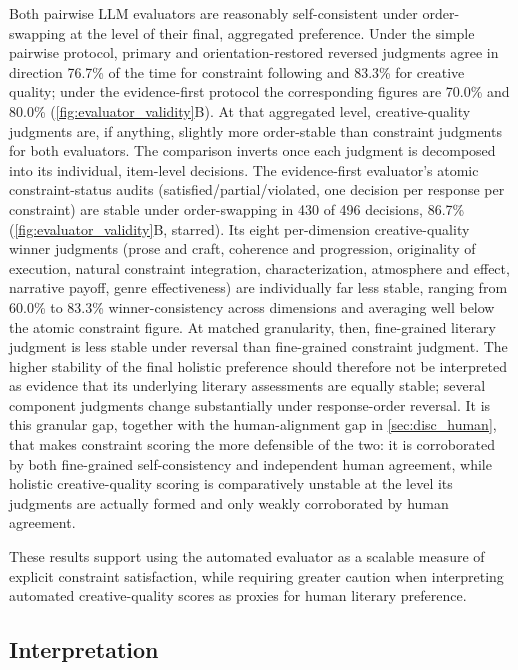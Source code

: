 Both pairwise LLM evaluators are reasonably self-consistent under order-swapping at the level of their final, aggregated preference. Under the simple pairwise protocol, primary and orientation-restored reversed judgments agree in direction 76.7\% of the time for constraint following and 83.3\% for creative quality; under the evidence-first protocol the corresponding figures are 70.0\% and 80.0\% (\cref{fig:evaluator_validity}B). At that aggregated level, creative-quality judgments are, if anything, slightly more order-stable than constraint judgments for both evaluators. The comparison inverts once each judgment is decomposed into its individual, item-level decisions. The evidence-first evaluator's atomic constraint-status audits (satisfied/partial/violated, one decision per response per constraint) are stable under order-swapping in 430 of 496 decisions, 86.7\% (\cref{fig:evaluator_validity}B, starred). Its eight per-dimension creative-quality winner judgments (prose and craft, coherence and progression, originality of execution, natural constraint integration, characterization, atmosphere and effect, narrative payoff, genre effectiveness) are individually far less stable, ranging from 60.0\% to 83.3\% winner-consistency across dimensions and averaging well below the atomic constraint figure. At matched granularity, then, fine-grained literary judgment is less stable under reversal than fine-grained constraint judgment. The higher stability of the final holistic preference should therefore not be interpreted as evidence that its underlying literary assessments are equally stable; several component judgments change substantially under response-order reversal. It is this granular gap, together with the human-alignment gap in \cref{sec:disc_human}, that makes constraint scoring the more defensible of the two: it is corroborated by both fine-grained self-consistency and independent human agreement, while holistic creative-quality scoring is comparatively unstable at the level its judgments are actually formed and only weakly corroborated by human agreement.

These results support using the automated evaluator as a scalable measure of explicit constraint satisfaction, while requiring greater caution when interpreting automated creative-quality scores as proxies for human literary preference.

\subsection{Interpretation}
\label{sec:disc_interpretation}

